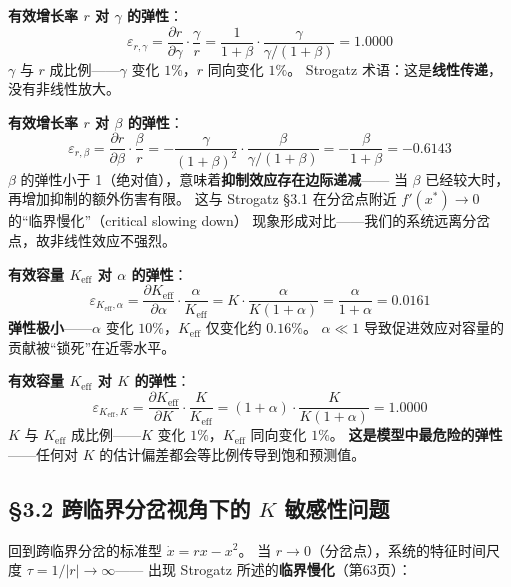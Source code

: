 \documentclass[12pt,a4paper]{article}
\begin{document}
\textbf{有效增长率 $r$ 对 $\gamma$ 的弹性}：
\begin{equation}
\varepsilon_{r, \gamma} = \frac{\partial r}{\partial \gamma} \cdot \frac{\gamma}{r}
= \frac{1}{1+\beta} \cdot \frac{\gamma}{\gamma/(1+\beta)} = 1.0000
\end{equation}
$\gamma$ 与 $r$ 成比例——$\gamma$ 变化 $1\%$，$r$ 同向变化 $1\%$。
Strogatz 术语：这是\textbf{线性传递}，没有非线性放大。

\textbf{有效增长率 $r$ 对 $\beta$ 的弹性}：
\begin{equation}
\varepsilon_{r, \beta} = \frac{\partial r}{\partial \beta} \cdot \frac{\beta}{r}
= -\frac{\gamma}{(1+\beta)^2} \cdot \frac{\beta}{\gamma/(1+\beta)}
= -\frac{\beta}{1+\beta} = -0.6143
\end{equation}
$\beta$ 的弹性小于 1（绝对值），意味着\textbf{抑制效应存在边际递减}——
当 $\beta$ 已经较大时，再增加抑制的额外伤害有限。
这与 Strogatz \S3.1 在分岔点附近 $f'(x^*) \to 0$ 的``临界慢化''（critical slowing down）
现象形成对比——我们的系统远离分岔点，故非线性效应不强烈。

\textbf{有效容量 $K_{\text{eff}}$ 对 $\alpha$ 的弹性}：
\begin{equation}
\varepsilon_{K_{\text{eff}}, \alpha} = \frac{\partial K_{\text{eff}}}{\partial \alpha}
\cdot \frac{\alpha}{K_{\text{eff}}}
= K \cdot \frac{\alpha}{K(1+\alpha)} = \frac{\alpha}{1+\alpha} = 0.0161
\end{equation}
\textbf{弹性极小}——$\alpha$ 变化 $10\%$，$K_{\text{eff}}$ 仅变化约 $0.16\%$。
$\alpha \ll 1$ 导致促进效应对容量的贡献被``锁死''在近零水平。

\textbf{有效容量 $K_{\text{eff}}$ 对 $K$ 的弹性}：
\begin{equation}
\varepsilon_{K_{\text{eff}}, K} = \frac{\partial K_{\text{eff}}}{\partial K}
\cdot \frac{K}{K_{\text{eff}}}
= (1+\alpha) \cdot \frac{K}{K(1+\alpha)} = 1.0000
\end{equation}
$K$ 与 $K_{\text{eff}}$ 成比例——$K$ 变化 $1\%$，$K_{\text{eff}}$ 同向变化 $1\%$。
\textbf{这是模型中最危险的弹性}——任何对 $K$ 的估计偏差都会等比例传导到饱和预测值。

\subsection{\S3.2 跨临界分岔视角下的 $K$ 敏感性问题}

回到跨临界分岔的标准型 $\dot{x} = r x - x^2$。
当 $r \to 0$（分岔点），系统的特征时间尺度 $\tau = 1/|r| \to \infty$——
出现 Strogatz 所述的\textbf{临界慢化}（第63页）：
\end{document}
